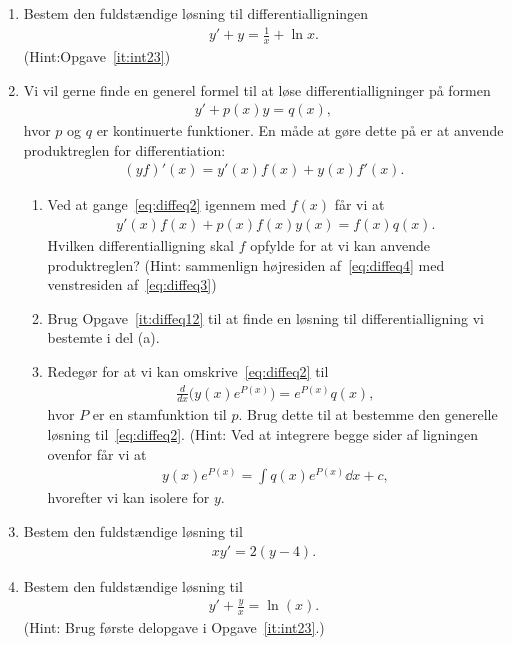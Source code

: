 \begin{enumerate}
	\item Bestem den fuldstændige løsning til differentialligningen
	\begin{align*}
	y'+y=\frac{1}{x}+\ln x.
	\end{align*}
	(Hint:Opgave~\ref{it:int23})
	
	
	\item Vi vil gerne finde en generel formel til at løse differentialligninger på formen
	\begin{align}\label{eq:diffeq2}
	y'+p(x)y=q(x),
	\end{align}
	hvor $p$ og $q$ er kontinuerte funktioner. En måde at gøre dette på er at anvende produktreglen for differentiation:
	\begin{align}\label{eq:diffeq4}
	(yf)'(x)=y'(x)f(x)+y(x)f'(x).
	\end{align}
	\begin{enumerate}
		\item Ved at gange~\eqref{eq:diffeq2} igennem med $f(x)$ får vi at
		\begin{align}\label{eq:diffeq3}
		y'(x)f(x)+p(x)f(x)y(x)=f(x)q(x).
		\end{align}
		Hvilken differentialligning skal $f$ opfylde for at vi kan anvende produktreglen? (Hint: sammenlign højresiden af~\eqref{eq:diffeq4} med venstresiden af~\eqref{eq:diffeq3})
		
		\item Brug Opgave~\ref{it:diffeq12} til at finde en løsning til differentialligning vi bestemte i del (a). 
		
		\item Redegør for at vi kan omskrive~\eqref{eq:diffeq2} til
		\begin{align*}
		\frac{d}{dx} \Big(y(x) e^{P(x)} \Big)=e^{P(x)}q(x),
		\end{align*}
		hvor $P$ er en stamfunktion til $p$. Brug dette til at bestemme den generelle løsning til~\eqref{eq:diffeq2}. (Hint: Ved at integrere begge sider af ligningen ovenfor får vi at
		\begin{align*}
		y(x)e^{P(x)}=\int q(x)e^{P(x)}\dd x+c,
		\end{align*}
		hvorefter vi kan isolere for $y$.
	\end{enumerate}
	
	\item Bestem den fuldstændige løsning til
	\begin{align*}
	xy'=2(y-4).
	\end{align*}
	
	\item Bestem den fuldstændige løsning til 
	\begin{align*}
	y'+\frac{y}{x}=\ln(x).
	\end{align*}
	(Hint: Brug første delopgave i Opgave~\ref{it:int23}.)
	
	
\end{enumerate}